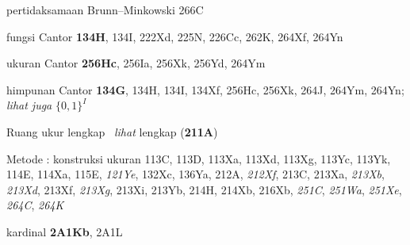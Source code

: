 



































 pertidaksamaan Brunn--Minkowski 266C













\indexmedskip















 fungsi Cantor {\bf 134H}, 134I, 222Xd, 225N, 226Cc, 262K, 264Xf, 264Yn

ukuran Cantor {\bf 256Hc}, 256Ia, 256Xk, 256Yd, 264Ym


himpunan Cantor {\bf 134G}, 134H, 134I, 134Xf, 256Hc, 256Xk, 264J, 264Ym, 264Yn; {\it lihat juga} $\{0,1\}^I$









\indexheader{\Caratheodory} Ruang ukur lengkap \Caratheodory\ {\it lihat} lengkap ({\bf 211A})


Metode \Caratheodory: konstruksi ukuran 113C, 113D, 113Xa, 113Xd, 113Xg, 113Yc, 113Yk, 114E, 114Xa, 115E, {\it 121Ye}, 132Xc, 136Ya, 212A, {\it 212Xf}, 213C, 213Xa, {\it 213Xb}, {\it 213Xd}, 213Xf, {\it 213Xg}, 213Xi, 213Yb, 214H, 214Xb, 216Xb, {\it 251C}, {\it 251Wa}, {\it 251Xe}, {\it 264C}, {\it 264K}


 kardinal {\bf 2A1Kb}, 2A1L





















